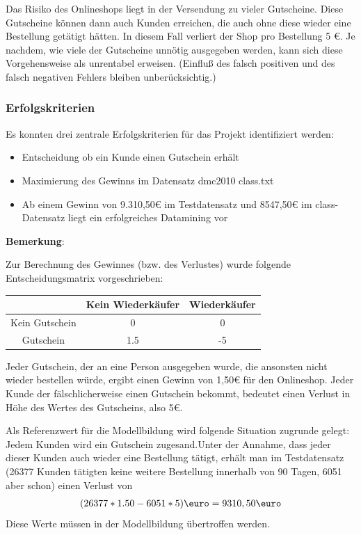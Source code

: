 \documentclass[a4paper,12pt]{article}
\begin{document}
Das Risiko des Onlineshops liegt in der Versendung zu vieler Gutscheine. Diese Gutscheine können dann auch Kunden erreichen, die auch ohne diese wieder eine Bestellung getätigt hätten. In diesem Fall verliert der Shop pro Bestellung 5 \euro. Je nachdem, wie viele der Gutscheine unnötig ausgegeben werden, kann
sich diese Vorgehensweise als unrentabel erweisen. (Einfluß des falsch positiven und des falsch negativen Fehlers bleiben unberücksichtig.)

\subsubsection{Erfolgskriterien}
Es konnten drei zentrale Erfolgskriterien für das Projekt identifiziert werden:
\begin{itemize}
	\item Entscheidung ob ein Kunde einen Gutschein erhält
	\item Maximierung des Gewinns im Datensatz dmc2010 class.txt
	\item Ab einem Gewinn von 9.310,50\euro\; im Testdatensatz und 8547,50\euro\; im class-Datensatz liegt ein erfolgreiches Datamining vor
\end{itemize}

\textbf{Bemerkung}:
\par
Zur Berechnung des Gewinnes (bzw. des Verlustes) wurde folgende Entscheidungsmatrix vorgeschrieben:
\begin{center}
\begin{tabular}{|c | c | c |}
\hline
 & Kein Wiederkäufer & Wiederkäufer
\\
\hline
Kein Gutschein & 0 & 0
\\
\hline
Gutschein & 1.5 & -5
\\
\hline
\end{tabular}
\end{center}
Jeder Gutschein, der an eine Person ausgegeben wurde, die ansonsten nicht wieder bestellen
würde, ergibt einen Gewinn von 1,50\euro\; für den Onlineshop. Jeder Kunde der fälschlicherweise
einen Gutschein bekommt, bedeutet einen Verlust in  Höhe des Wertes des Gutscheins, also 5\euro.

Als Referenzwert\label{Referenzwerte} für die Modellbildung wird folgende Situation
zugrunde gelegt: Jedem Kunden wird ein Gutschein zugesand.Unter der Annahme, dass jeder dieser Kunden auch wieder eine Bestellung tätigt, erhält man im Testdatensatz (26377 Kunden tätigten keine weitere Bestellung innerhalb von 90 Tagen, 6051 aber schon) einen Verlust von
\begin{align*}
(26377 *1.50 - 6051*5)\text{\euro} = 9310,50 \text{\euro}
\end{align*}
Diese Werte müssen in der Modellbildung übertroffen werden.
\end{document}
